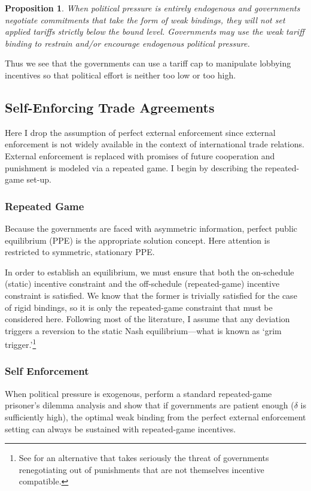 \documentclass[12pt]{article}
\newtheorem{proposition}{Proposition}
\newcommand{\de}{\delta}
\begin{document}
\begin{proposition}
    When political pressure is entirely endogenous and governments negotiate commitments that take the form of weak bindings, they will not set applied tariffs strictly below the bound level. Governments may use the weak tariff binding to restrain and/or encourage endogenous political pressure.
		\label{res:weak}
\end{proposition}

Thus we see that the governments can use a tariff cap to manipulate lobbying incentives so that political effort is neither too low or too high.
					
	
\subsection{Self-Enforcing Trade Agreements}
\label{sec:self}
Here I drop the assumption of perfect external enforcement since external enforcement is not widely available in the context of international trade relations. External enforcement is replaced with promises of future cooperation and punishment is modeled via a repeated game. I begin by describing the repeated-game set-up. 

\subsubsection{Repeated Game}
Because the governments are faced with asymmetric information, perfect public equilibrium (PPE) is the appropriate solution concept. Here attention is restricted to symmetric, stationary PPE.
	
In order to establish an equilibrium, we must ensure that both the on-schedule (static) incentive constraint and the off-schedule (repeated-game) incentive constraint is satisfied. We know that the former is trivially satisfied for the case of rigid bindings, so it is only the repeated-game constraint that must be considered here. Following most of the literature, I assume that any deviation triggers a reversion to the static Nash equilibrium---what is known as `grim trigger.'\footnote{See \Textcite{krw} for an alternative that takes seriously the threat of governments renegotiating out of punishments that are not themselves incentive compatible.\label{fn:krw}}
	
\subsubsection{Self Enforcement}
\label{sec:selfweak}
When political pressure is exogenous, \Textcite{bs2005} perform a standard repeated-game prisoner's dilemma analysis and show that if governments are patient enough ($\de$ is sufficiently high), the optimal weak binding from the perfect external enforcement setting can always be sustained with repeated-game incentives.
\end{document}
